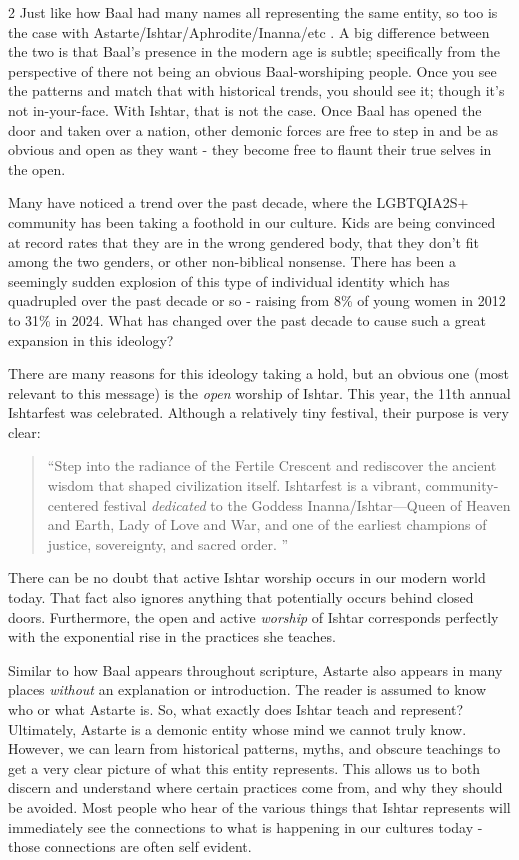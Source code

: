 \documentclass[10pt]{article}
\begin{document}
\begin{multicols}{2}
Just like how Baal had many names all representing the same entity\cite{baal}, so too is the case with Astarte/Ishtar/Aphrodite/Inanna/etc \cite{ishtar is astarte, ishtar is inanna}. A big difference between the two is that Baal's presence in the modern age is subtle; specifically from the perspective of there not being an obvious Baal-worshiping people. Once you see the patterns and match that with historical trends, you should see it; though it's not in-your-face. With Ishtar, that is not the case. Once Baal has opened the door and taken over a nation, other demonic forces are free to step in and be as obvious and open as they want - they become free to flaunt their true selves in the open. 

Many have noticed a trend over the past decade, where the LGBTQIA2S+\cite{lgbtqia2s} community has been taking a foothold in our culture.  Kids are being convinced at record rates that they are in the wrong gendered body, that they don't fit among the two genders, or other non-biblical nonsense. There has been a seemingly sudden explosion of this type of individual identity which has quadrupled over the past decade or so - raising from 8\% of young women in 2012 to 31\% in 2024\cite{lgbtqrise}. What has changed over the past decade to cause such a great expansion in this ideology? 

There are many reasons for this ideology taking a hold, but an obvious one (most relevant to this message) is the \textit{open} worship of Ishtar. This year, the 11th annual Ishtarfest was celebrated. Although a relatively tiny festival, their purpose is very clear:
\begin{quotation}
``Step into the radiance of the Fertile Crescent and rediscover the ancient wisdom that shaped civilization itself. Ishtarfest is a vibrant, community-centered festival \textit{dedicated} to the Goddess Inanna/Ishtar—Queen of Heaven and Earth, Lady of Love and War, and one of the earliest champions of justice, sovereignty, and sacred order. \cite{Ishtarfest 2026}''
\end{quotation}
There can be no doubt that active Ishtar worship occurs in our modern world today. That fact also ignores anything that potentially occurs behind closed doors. Furthermore, the open and active \textit{worship} of Ishtar corresponds perfectly with the exponential rise in the practices she teaches. 

Similar to how Baal appears throughout scripture, Astarte also appears in many places \textit{without} an explanation or introduction. The reader is assumed to know who or what Astarte is. So, what exactly does Ishtar teach and represent? Ultimately, Astarte is a demonic entity whose mind we cannot truly know\cite{part3}. However, we can learn from historical patterns, myths, and obscure teachings to get a very clear picture of what this entity represents. This allows us to both discern and understand where certain practices come from, and why they should be avoided. Most people who hear of the various things that Ishtar represents will immediately see the connections to what is happening in our cultures today - those connections are often self evident. 


\end{multicols}
\end{document}
